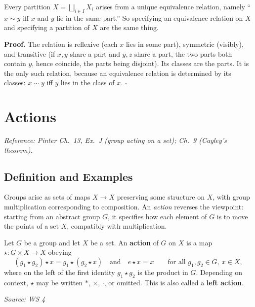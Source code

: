 \documentclass[11pt]{report}
\renewenvironment{proof}[1][Proof]{\noindent\textbf{#1.} }{\hfill$\square$\par\vspace{5pt}}
\newcommand{\srcline}[1]{\par\hfill{\footnotesize\textit{Source: #1}}}
\begin{document}
\begin{propbox}\label{prop:partitions-come-equivalence-relations}
Every partition $X = \bigsqcup_{i \in I} X_i$ arises from a unique equivalence relation, namely ``$x \sim y$ iff $x$ and $y$ lie in the same part.'' So specifying an equivalence relation on $X$ and specifying a partition of $X$ are the same thing.
\end{propbox}

\begin{proof}
The relation is reflexive (each $x$ lies in some part), symmetric (visibly), and transitive (if $x, y$ share a part and $y, z$ share a part, the two parts both contain $y$, hence coincide, the parts being disjoint). Its classes are the parts. It is the only such relation, because an equivalence relation is determined by its classes: $x \sim y$ iff $y$ lies in the class of $x$.
\end{proof}

\section{Actions}\label{sec:action-def}

\textit{Reference: Pinter Ch.\ 13, Ex.\ J (group acting on a set); Ch.\ 9 (Cayley's theorem).}

\subsection{Definition and Examples}

\begin{rembox}[Motivation]\label{rem:motivation}
Groups arise as sets of maps $X \to X$ preserving some structure on $X$, with group multiplication corresponding to composition. An \emph{action} reverses the viewpoint: starting from an abstract group $G$, it specifies how each element of $G$ is to move the points of a set $X$, compatibly with multiplication.
\end{rembox}

\begin{defbox}[{Action}]\label{def:action-right-action}
Let $G$ be a group and let $X$ be a set. An \textbf{action} of $G$ on $X$ is a map $\star: G \times X \to X$ obeying
\[ (g_1 \star g_2) \star x = g_1 \star (g_2 \star x) \quad\text{and}\quad e \star x = x \qquad \text{for all } g_1, g_2 \in G,\ x \in X, \]
where on the left of the first identity $g_1 \star g_2$ is the product in $G$. Depending on context, $\star$ may be written $*$, $\times$, $\cdot$, or omitted. This is also called a \textbf{left action}.
\srcline{WS 4}
\end{defbox}
\end{document}
